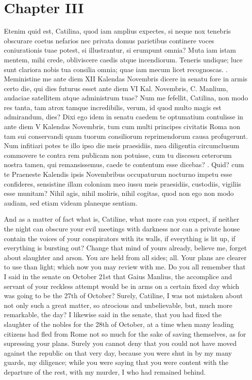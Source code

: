 \documentclass[a4paper]{article}
\begin{document}
\section{Chapter III}
\begin{pairs}
  \begin{Leftside}
    \beginnumbering
    \pstart
    Etenim quid est, Catilina, quod iam amplius expectes, si neque nox tenebris obscurare coetus nefarios nec privata domus parietibus continere voces coniurationis tuae potest, si illustrantur, si erumpunt omnia? Muta iam istam mentem, mihi crede, obliviscere caedis atque incendiorum. Teneris undique; luce sunt clariora nobis tua consilia omnia; quae iam mecum licet recognoscas.
    \pend
    . Meministine me ante diem XII Kalendas Novembris dicere in senatu fore in armis certo die, qui dies futurus esset ante diem VI Kal. Novembris, C. Manlium, audaciae satellitem atque administrum tuae? Num me fefellit, Catilina, non modo res tanta, tam atrox tamque incredibilis, verum, id quod multo magis est admirandum, dies? Dixi ego idem in senatu caedem te optumatium contulisse in ante diem V Kalendas Novembris, tum cum multi principes civitatis Roma non tam sui conservandi quam tuorum consiliorum reprimendorum causa profugerunt. Num infitiari potes te illo ipso die meis praesidiis, mea diligentia circumclusum commovere te contra rem publicam non potuisse, cum tu discessu ceterorum nostra tamen, qui remansissemus, caede te contentum esse dicebas?
    \pend
    . Quid? cum te Praeneste Kalendis ipsis Novembribus occupaturum nocturno impetu esse confideres, sensistine illam coloniam meo iussu meis praesidiis, custodiis, vigiliis esse munitam? Nihil agis, nihil moliris, nihil cogitas, quod non ego non modo audiam, sed etiam videam planeque sentiam.
    \pend
    \endnumbering
  \end{Leftside}
  \begin{Rightside}
    \beginnumbering
    \pstart
    And as a matter of fact what is, Catiline, what more can you expect, if neither the night can obscure your evil meetings with darkness nor can a private house contain the voices of your conspirators with its walls, if everything is lit up, if everything is bursting out? Change that mind of yours already, believe me, forget about slaughter and arson. You are held from all sides; all. Your plans are clearer to use than light; which now you may review with me.
    \pend
    \pstart
    Do you all remember that I said in the senate on October 21st that Gaius Manlius, the accomplice and servant of your reckless attempt would be in arms on a certain fixed day which was going to be the 27th of October? Surely, Catiline, I was not mistaken about not only such a great matter, so atrocious and unbelievable, but, much more remarkable, the day? I likewise said in the senate, that you had fixed the slaughter of the nobles for the 28th of October, at a time when many leading citizens had fled from Rome not so much for the sake of saving themselves, as for supressing your plans. Surely you cannot deny that you could not have moved against the republic on that very day, because you were shut in by my many guards, my diligence; while you were saying that you were content with the departure of the rest, with my murder, I who had remained behind.

\end{Rightside}
\end{pairs}
\end{document}
